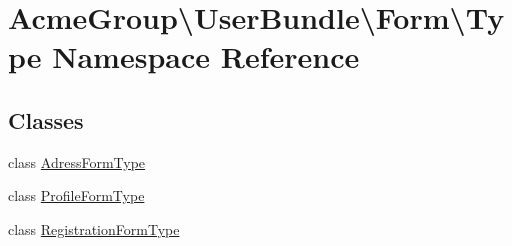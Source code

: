 \hypertarget{namespace_acme_group_1_1_user_bundle_1_1_form_1_1_type}{\section{Acme\+Group\textbackslash{}User\+Bundle\textbackslash{}Form\textbackslash{}Type Namespace Reference}
\label{namespace_acme_group_1_1_user_bundle_1_1_form_1_1_type}
}
\subsection*{Classes}
\begin{DoxyCompactItemize}
\item 
class \hyperlink{class_acme_group_1_1_user_bundle_1_1_form_1_1_type_1_1_adress_form_type}{Adress\+Form\+Type}
\item 
class \hyperlink{class_acme_group_1_1_user_bundle_1_1_form_1_1_type_1_1_profile_form_type}{Profile\+Form\+Type}
\item 
class \hyperlink{class_acme_group_1_1_user_bundle_1_1_form_1_1_type_1_1_registration_form_type}{Registration\+Form\+Type}
\end{DoxyCompactItemize}
